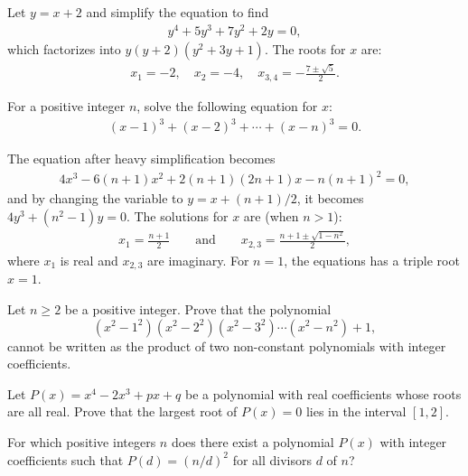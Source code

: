 \begin{solution}
    Let $y=x+2$ and simplify the equation to find
    \begin{align*}
        y^4+5y^3+7y^2+2y=0,
    \end{align*}
    which factorizes into $y(y+2)(y^2+3y+1)$. The roots for $x$ are:
    \begin{align*}
        x_1=-2, \quad x_2=-4,\quad x_{3,4}=-\frac{7\pm\sqrt{5}}{2}.
    \end{align*}
\end{solution}


\begin{question}
    For a positive integer $n$, solve the following equation for $x$:
    \begin{align*}
        (x-1)^3 + (x-2)^3 + \cdots + (x-n)^3 = 0.
    \end{align*}
\end{question}

\begin{solution}
    The equation after heavy simplification becomes
    \begin{align*}
        4x^3 - 6(n+1)x^2 + 2(n+1)(2n+1)x-n(n+1)^2=0,
    \end{align*}
    and by changing the variable to $y= x + (n+1)/2$, it becomes $4y^3 + (n^2-1)y=0$. The solutions for $x$ are (when $n>1$):
    \begin{align*}
        x_1 = \frac{n+1}{2} \qquad \text{and} \qquad x_{2,3}=\frac{n+1\pm\sqrt{1-n^2}}{2},
    \end{align*}
    where $x_1$ is real and $x_{2,3}$ are imaginary. For $n=1$, the equations has a triple root $x=1$.
\end{solution}


\begin{question}[name={2005 Switzerland TST}]
    Let $n\geq 2$ be a positive integer. Prove that the polynomial
    \[(x^2-1^2)(x^2-2^2)(x^2-3^2)\cdots (x^2-n^2)+1,\]
    cannot be written as the product of two non-constant polynomials with integer coefficients.
\end{question}


\begin{question}[name={2008 Switzerland TST}]
    Let $P(x)=x^4-2x^3+px+q$ be a polynomial with real coefficients whose roots are all real. Prove that the largest root of $P(x)=0$ lies in the interval $[1,2]$.
\end{question}


\begin{question}[name={2009 Switzerland TST}]
    For which positive integers $n$ does there exist a polynomial $P(x)$ with integer coefficients such that $P(d)=(n/d)^2$ for all divisors $d$ of $n$?
\end{question}


